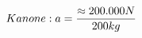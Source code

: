 \documentclass[preview]{standalone}
\begin{document}
\begin{align*}
\special{dvisvgm:raw <g id='unique000'>}Kanone: a = \frac{\approx 200.000 N}{200 kg}\special{dvisvgm:raw </g>}
\end{align*}
\end{document}
